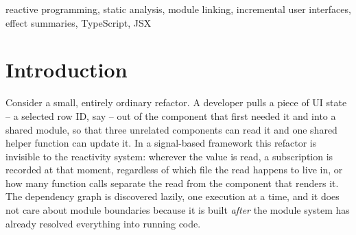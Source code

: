 \documentclass[conference]{IEEEtran}
\begin{document}
\begin{abstract}
and invalidation scheme, and prove dirty-set coverage conditional on five
explicit soundness obligations -- read coverage, write coverage, summary
soundness, commit instrumentation, and pattern--instance consistency --
together with a closed-world linking assumption. We state these assumptions
explicitly rather than treating them as implicit. We are equally explicit
about the cost of this design: static
linking trades read-time dependency discovery for conservative branch unions,
structural wildcard expansion, and whole-subtree fallbacks wherever an effect
cannot be bounded. In a purposive corpus of 88 write-effect sites, linking
reduced the unbounded tier from 45.45\% to 0.00\%; across 25 concrete oracle
executions, static selection achieved 100\% observed recall and 80.0\%
precision. A rendering-free mechanism benchmark found no uniform routing
advantage: the static median was lower in one of six topologies and higher in
the other five, with lifecycle cost depending strongly on wildcard density.
\end{abstract}

\begin{IEEEkeywords}
reactive programming, static analysis, module linking, incremental user
interfaces, effect summaries, TypeScript, JSX
\end{IEEEkeywords}

\section{Introduction}

Consider a small, entirely ordinary refactor. A developer pulls a piece of UI
state -- a selected row ID, say -- out of the component that first needed it
and into a shared module, so that three unrelated components can read it and
one shared helper function can update it. In a signal-based framework this
refactor is invisible to the reactivity system: wherever the value is read,
a subscription is recorded at that moment, regardless of which file the read
happens to live in, or how many function calls separate the read from the
component that renders it. The dependency graph is discovered lazily, one
execution at a time, and it does not care about module boundaries because it
is built \emph{after} the module system has already resolved everything into
running code.
\end{document}
